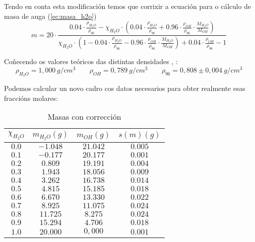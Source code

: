 \documentclass[12pt, a4paper, titlepage]{article}
\begin{document}
  Tendo en conta esta modificación temos que corrixir a ecuación para o cálculo de masa de auga (\ref{ec:masa_h2o})
  \begin{equation}
    m = 20 \cdot \frac{0.04 \cdot \frac{\rho_{H_2O}}{\rho_{96}} - \chi_{H_2O} \cdot \left( 0.04 \cdot \frac{\rho_{H_2O}}{\rho_{96}} + 0.96 \cdot \frac{\rho_{OH}}{\rho_{96}} \cdot \frac{M_{H_2O}}{M_{OH}} \right)}{\chi_{H_2O} \cdot \left(1 - 0.04 \cdot \frac{\rho_{H_2O}}{\rho_{96}} - 0.96 \cdot \frac{\rho_{OH}}{\rho_{96}} \cdot \frac{M_{H_2O}}{M_{OH}} \right) + 0.04 \cdot \frac{\rho_{OH}}{\rho_{96}} - 1}
    \label{ec:masa_h2o_corrixida}
  \end{equation}

  Coñecendo os valores teóricos das distintas densidades \cite{wolfram}, \cite{ethanol}:
  \begin{equation*}
    \rho_{H_2O} = 1,000 \ g/cm^3 \qquad \rho_{OH} = 0,789 \ g/cm^3 \qquad \rho_{96} = 0,808 \pm 0,004 \ g/cm^3
  \end{equation*}

  Podemos calcular un novo cadro cos datos necesarios para obter realmente esas fraccións molares:

  \begin{table}[H]
    \centering
    \begin{tabular}{|c|c|c|c|}
    \hline
    $\chi_{H_2O}$ & $m_{H_2O} (g)$ & $m_{OH} (g)$ & $s(m) (g)$ \\ \hline
    $ 0.0 $  &  $ -1.048 $  &  $ 21.042 $ & $0.005$ \\ \hline
    $ 0.1 $  &  $ -0.177 $  &  $ 20.177 $ & $0.001$ \\ \hline
    $ 0.2 $  &  $ 0.809 $  &  $ 19.191 $ & $0.004$ \\ \hline
    $ 0.3 $  &  $ 1.943 $  &  $ 18.056 $ & $0.009$ \\ \hline
    $ 0.4 $  &  $ 3.262 $  &  $ 16.738 $ & $0.014$ \\ \hline
    $ 0.5 $  &  $ 4.815 $  &  $ 15.185 $ & $0.018$ \\ \hline
    $ 0.6 $  &  $ 6.670 $  &  $ 13.330 $ & $0.022$ \\ \hline
    $ 0.7 $  &  $ 8.925 $  &  $ 11.075 $ & $0.024$ \\ \hline
    $ 0.8 $  &  $ 11.725 $  &  $ 8.275 $ & $0.024$ \\ \hline
    $ 0.9 $  &  $ 15.294 $  &  $ 4.706 $ & $0.018$ \\ \hline
    $ 1.0 $  &  $ 20.000 $  &  $ 0,000 $ & $0.001$ \\ \hline
    \end{tabular}
    \caption{Masas con corrección}
    \label{cad:masas_con_correccion}
  \end{table}
\end{document}
